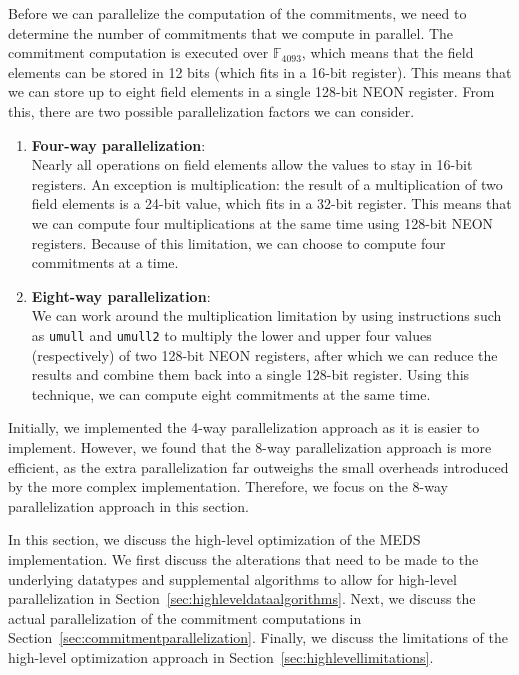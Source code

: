 \documentclass[11pt,a4paper]{report}
\theoremstyle{definition}
\begin{document}
Before we can parallelize the computation of the commitments, we need to determine the number of commitments that we compute in parallel. The commitment computation is executed over $\mathbb{F}_{4093}$, which means that the field elements can be stored in 12 bits (which fits in a 16-bit register). This means that we can store up to eight field elements in a single 128-bit NEON register. From this, there are two possible parallelization factors we can consider.
\begin{enumerate}
  \item \textbf{Four-way parallelization}:\\
        Nearly all operations on field elements allow the values to stay in 16-bit registers. An exception is multiplication: the result of a multiplication of two field elements is a 24-bit value, which fits in a 32-bit register. This means that we can compute four multiplications at the same time using 128-bit NEON registers. Because of this limitation, we can choose to compute four commitments at a time.
  \item \textbf{Eight-way parallelization}:\\
        We can work around the multiplication limitation by using instructions such as \texttt{umull} and \texttt{umull2} to multiply the lower and upper four values (respectively) of two 128-bit NEON registers, after which we can reduce the results and combine them back into a single 128-bit register. Using this technique, we can compute eight commitments at the same time.
\end{enumerate}
Initially, we implemented the 4-way parallelization approach as it is easier to implement. However, we found that the 8-way parallelization approach is more efficient, as the extra parallelization far outweighs the small overheads introduced by the more complex implementation. Therefore, we focus on the 8-way parallelization approach in this section.

In this section, we discuss the high-level optimization of the MEDS implementation. We first discuss the alterations that need to be made to the underlying datatypes and supplemental algorithms to allow for high-level parallelization in Section~\ref{sec:highleveldataalgorithms}. Next, we discuss the actual parallelization of the commitment computations in Section~\ref{sec:commitmentparallelization}. Finally, we discuss the limitations of the high-level optimization approach in Section~\ref{sec:highlevellimitations}.
\end{document}
